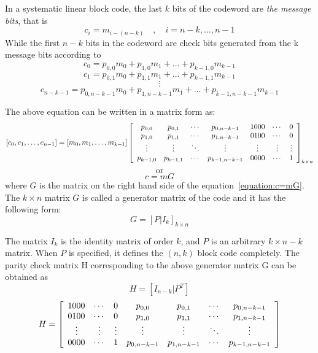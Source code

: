 In a systematic linear block code, the last $k$ bits of the codeword are \emph{the message bits}, that is
\[ c_i = m_{i-(n-k)} \quad , \quad i = n-k, \ldots , n-1 \]
While the first $n-k$ bits in the codeword are check bits generated from the k message bits according to
\[ c_0 = p_{0,0} m_0 + p_{1,0} m_1 + \ldots + p_{k-1, 0} m_{k-1} \]
\[ c_1 = p_{0,1} m_0 + p_{1,1} m_1 + \ldots + p_{k-1, 1} m_{k-1} \]
\[ \vdots \]
\[ c_{n-k-1} = p_{0,n-k-1} m_0 + p_{1,n-k-1} m_1 + \ldots + p_{k-1, n-k-1} m_{k-1} \]

The above equation can be written in a matrix form as:
\begin{equation}
    \label{equation:c=mG}
    [ c_0, c_1, \ldots, c_{n-1} ] = [ m_0, m_1, \ldots, m_{k-1} ] \left[ \begin{array}{c c c c c c c}
        p_{0,0} & p_{0,1} & \cdots & p_{0,n-k-1} & 1000 & \cdots & 0 \\
        p_{1,0} & p_{1,1} & \cdots & p_{1,n-k-1} & 0100 & \cdots & 0 \\
        \vdots & \vdots & \ddots & \vdots & \vdots & \vdots & \vdots \\
        p_{k-1,0} & p_{k-1,1} & \cdots & p_{k-1,n-k-1} & 0000 & \cdots & 1 \\     
    \end{array} \right]_{k \times n}
\end{equation}
\[ \text{or} \]
\[ c = mG \]
where $G$ is the matrix on the right hand side of the equation~\ref{equation:c=mG}. \\
The $k \times n$ matrix $G$ is called a generator matrix of the code and it has the following form:
\begin{equation}
    \label{eq:G}
    G = \left[ P | I_k \right]_{k \times n}
\end{equation}

The matrix $I_k$ is the identity matrix of order $k$, and $P$ is an arbitrary $k \times n-k $ matrix. When $P$ is specified, it defines the $(n, k)$ block code completely. The parity check matrix H corresponding to the above generator matrix G can be obtained as
\[ H = \left[ I_{n-k} | P^T \right] \]
\begin{equation}
    \label{equation:H}
    H = \left[ \begin{array}{c c c c c c c}
        1000 & \cdots & 0 & p_{0,0} & p_{0,1} & \cdots & p_{0,n-k-1} \\
        0100 & \cdots & 0 & p_{1,0} & p_{1,1} & \cdots & p_{1,n-k-1} \\
        \vdots & \vdots & \vdots & \vdots & \vdots & \ddots & \vdots \\
        0000 & \cdots & 1 & p_{0,n-k-1} & p_{1,n-k-1} & \cdots & p_{k-1,n-k-1} \\     
    \end{array} \right]
\end{equation}

